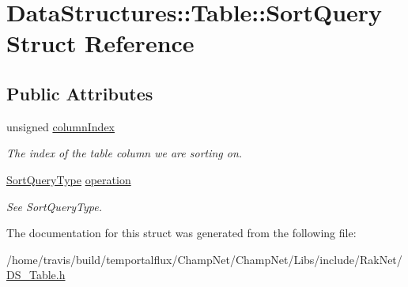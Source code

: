 \hypertarget{struct_data_structures_1_1_table_1_1_sort_query}{\section{Data\-Structures\-:\-:Table\-:\-:Sort\-Query Struct Reference}
\label{struct_data_structures_1_1_table_1_1_sort_query}
}
\subsection*{Public Attributes}
\begin{DoxyCompactItemize}
\item 
\hypertarget{struct_data_structures_1_1_table_1_1_sort_query_aba3987126a70fa6aa50a0abfc60b91ab}{unsigned \hyperlink{struct_data_structures_1_1_table_1_1_sort_query_aba3987126a70fa6aa50a0abfc60b91ab}{column\-Index}}\label{struct_data_structures_1_1_table_1_1_sort_query_aba3987126a70fa6aa50a0abfc60b91ab}

\begin{DoxyCompactList}\small\item\em The index of the table column we are sorting on. \end{DoxyCompactList}\item 
\hypertarget{struct_data_structures_1_1_table_1_1_sort_query_a34d1df32067ec566580fe72aea8f0d9c}{\hyperlink{class_data_structures_1_1_table_a736b2ab44bd8d4159bad88d4ae04665d}{Sort\-Query\-Type} \hyperlink{struct_data_structures_1_1_table_1_1_sort_query_a34d1df32067ec566580fe72aea8f0d9c}{operation}}\label{struct_data_structures_1_1_table_1_1_sort_query_a34d1df32067ec566580fe72aea8f0d9c}

\begin{DoxyCompactList}\small\item\em See Sort\-Query\-Type. \end{DoxyCompactList}\end{DoxyCompactItemize}


The documentation for this struct was generated from the following file\-:\begin{DoxyCompactItemize}
\item 
/home/travis/build/temportalflux/\-Champ\-Net/\-Champ\-Net/\-Libs/include/\-Rak\-Net/\hyperlink{_d_s___table_8h}{D\-S\-\_\-\-Table.\-h}\end{DoxyCompactItemize}
